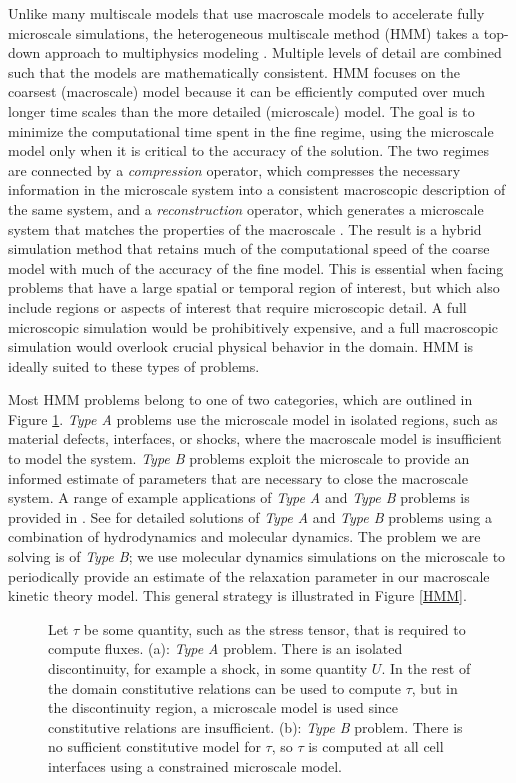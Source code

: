 \documentclass{article}
\begin{document}
Unlike many multiscale models that use macroscale models to accelerate fully microscale simulations, the heterogeneous multiscale method (HMM) takes a top-down approach to multiphysics modeling \cite{weinan2007heterogeneous}. Multiple levels of detail are combined such that the models are mathematically consistent. HMM focuses on the coarsest (macroscale) model because it can be efficiently computed over much longer time scales than the more detailed (microscale) model. The goal is to minimize the computational time spent in the fine regime, using the microscale model only when it is critical to the accuracy of the solution. The two regimes are connected by a \emph{compression} operator, which compresses the necessary information in the microscale system into a consistent macroscopic description of the same system, and a \emph{reconstruction} operator, which generates a microscale system that matches the properties of the macroscale \cite{weinan2007heterogeneous}. The result is a hybrid simulation method that retains much of the computational speed of the coarse model with much of the accuracy of the fine model. This is essential when facing problems that have a large spatial or temporal region of interest, but which also include regions or aspects of interest that require microscopic detail. A full microscopic simulation would be prohibitively expensive, and a full macroscopic simulation would overlook crucial physical behavior in the domain. HMM is ideally suited to these types of problems.

Most HMM problems belong to one of two categories, which are outlined in Figure \ref{TypeABexamples}. \emph{Type A} problems use the microscale model in isolated regions, such as material defects, interfaces, or shocks, where the macroscale model is insufficient to model the system. \emph{Type B} problems exploit the microscale to provide an informed estimate of parameters that are necessary to close the macroscale system. A range of example applications of \emph{Type A} and \emph{Type B} problems is provided in \cite{weinan2007heterogeneous}. See \cite{ren2005heterogeneous} for detailed solutions of \emph{Type A} and \emph{Type B} problems using a combination of hydrodynamics and molecular dynamics. The problem we are solving is of \emph{Type B}; we use molecular dynamics simulations on the microscale to periodically provide an estimate of the relaxation parameter in our macroscale kinetic theory model. This general strategy is illustrated in Figure \ref{HMM}.
\begin{figure}[h]
	\caption{Let $\tau$ be some quantity, such as the stress tensor, that is required to compute fluxes. (a): \emph{Type A} problem. There is an isolated discontinuity, for example a shock, in some quantity $U$. In the rest of the domain constitutive relations can be used to compute $\tau$, but in the discontinuity region, a microscale model is used since constitutive relations are insufficient. (b): \emph{Type B} problem. There is no sufficient constitutive model for $\tau$, so $\tau$ is computed at all cell interfaces using a constrained microscale model.}
	\label{TypeABexamples}
\end{figure}
\end{document}
